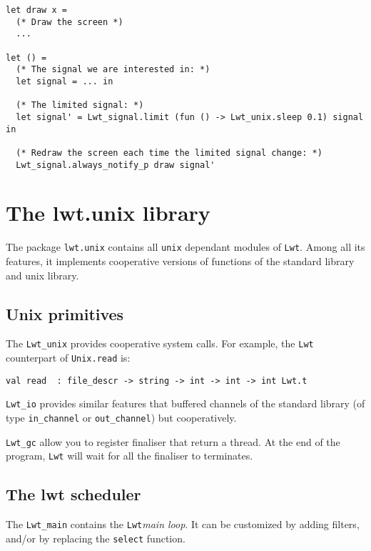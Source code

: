 \documentclass{article}
\newcommand{\lwt}{\texttt{Lwt}\xspace}
\begin{document}
\begin{verbatim}
let draw x =
  (* Draw the screen *)
  ...

let () =
  (* The signal we are interested in: *)
  let signal = ... in

  (* The limited signal: *)
  let signal' = Lwt_signal.limit (fun () -> Lwt_unix.sleep 0.1) signal in

  (* Redraw the screen each time the limited signal change: *)
  Lwt_signal.always_notify_p draw signal'
\end{verbatim}

\section{The lwt.unix library}
\label{lwt.unix}

The package \texttt{lwt.unix} contains all \texttt{unix} dependant
modules of \lwt. Among all its features, it implements cooperative
versions of functions of the standard library and unix library.

\subsection{Unix primitives}

The \texttt{Lwt\_unix} provides cooperative system calls. For example,
the \lwt counterpart of \texttt{Unix.read} is:

\begin{verbatim}
val read  : file_descr -> string -> int -> int -> int Lwt.t
\end{verbatim}

\texttt{Lwt\_io} provides similar features that buffered channels of
the standard library (of type \texttt{in\_channel} or
\texttt{out\_channel}) but cooperatively.

\texttt{Lwt\_gc} allow you to register finaliser that return a
thread. At the end of the program, \lwt will wait for all the
finaliser to terminates.

\subsection{The lwt scheduler}

The \texttt{Lwt\_main} contains the \lwt \emph{main loop}. It can be
customized by adding filters, and/or by replacing the \texttt{select}
function.
\end{document}
